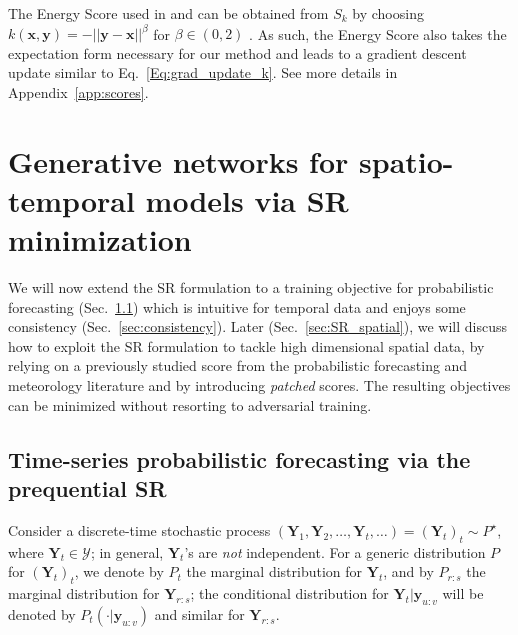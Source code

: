 \documentclass[twoside,11pt]{article}
\newcommand{\ddsim}{\mathbf{x}}
\newcommand{\ddobs}{\mathbf{y}}
\newcommand{\Ddobs}{\mathbf{Y}}
\begin{document}
	The Energy Score used in \cite{bouchacourt2016disco} and\cite{gritsenko2020spectral} can be obtained from $S_k $ by choosing
	$ k(\ddsim, \ddobs) =  - || \ddobs -\ddsim ||^\beta  $
	for $ \beta\in(0,2) $ \citep{gneiting2007strictly}. As such, the Energy Score also takes the expectation form necessary for our method and leads to a gradient descent update similar to Eq.~\eqref{Eq:grad_update_k}. See more details in Appendix~\ref{app:scores}.
	
	
	
	
	
	
	
	
	
	
	
	
	
	
	
	
	
	
	
	
	
	
	
	
	\section{Generative networks for spatio-temporal models via SR minimization}\label{sec:main}
	
	
	We will now extend the SR formulation to a training objective for probabilistic forecasting (Sec.~\ref{sec:preq_SR}) which is intuitive for temporal data and enjoys some consistency (Sec.~\ref{sec:consistency}). Later (Sec.~\ref{sec:SR_spatial}), we will discuss how to exploit the SR formulation to tackle high dimensional spatial data, by relying on a previously studied score from the probabilistic forecasting and meteorology literature \citep{scheuerer2015variogram} and by introducing \textit{patched} scores. 
	The resulting objectives can be minimized without resorting to adversarial training.
	
	
	
	
	\subsection{Time-series probabilistic forecasting via the prequential SR}\label{sec:preq_SR}
	
	
	
	Consider a discrete-time stochastic process $(\Ddobs_1, \Ddobs_2, \ldots, \Ddobs_t, \ldots ) = (\Ddobs_t)_t \sim P^{\star}$, where $\Ddobs_t\in \mathcal Y$; in general, $ \Ddobs_t $'s are \textit{not} independent. For a generic distribution $ P$ for $ (\Ddobs_t)_t $, we denote by $ P_t $ the marginal distribution for $ \Ddobs_t$, and by $ P_{r:s} $ the marginal distribution for $ \Ddobs_{r:s} $; the conditional distribution for $ \Ddobs_{t}|\ddobs_{u:v} $ will be denoted by 
	$ P_{t}(\cdot|\ddobs_{u:v}) $ and similar for $ \Ddobs_{r:s} $. 
	
\end{document}
